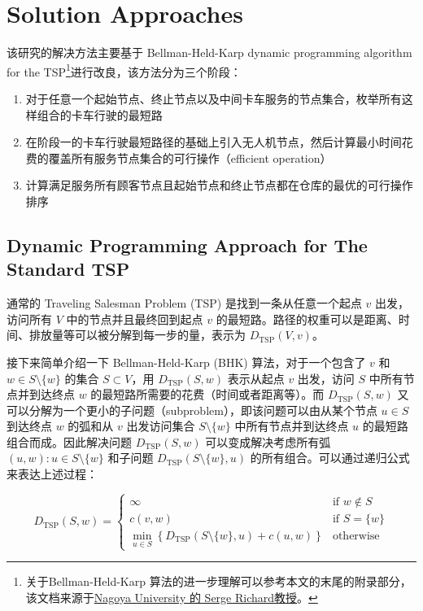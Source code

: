 \documentclass[fontset=none]{ctexart}
\begin{document}
\section{Solution Approaches}

该研究的解决方法主要基于 Bellman-Held-Karp dynamic programming algorithm for the TSP\footnote{关于Bellman-Held-Karp 算法的进一步理解可以参考本文的末尾的附录部分，该文档来源于\href{https://www.math.nagoya-u.ac.jp/~richard/teaching/s2020/Quang1.pdf}{Nagoya University 的 Serge Richard教授}。}进行改良\cite{bellmanDynamicProgrammingTreatment1962, heldDynamicProgrammingApproach1961}，该方法分为三个阶段：

\begin{enumerate}
    \item 对于任意一个起始节点、终止节点以及中间卡车服务的节点集合，枚举所有这样组合的卡车行驶的最短路
    \item 在阶段一的卡车行驶最短路径的基础上引入无人机节点，然后计算最小时间花费的覆盖所有服务节点集合的可行操作（efficient operation）
    \item 计算满足服务所有顾客节点且起始节点和终止节点都在仓库的最优的可行操作排序
\end{enumerate}

\subsection{Dynamic Programming Approach for The Standard TSP}

通常的 Traveling Salesman Problem (TSP) 是找到一条从任意一个起点 $v$ 出发，访问所有 $V$ 中的节点并且最终回到起点 $v$ 的最短路。路径的权重可以是距离、时间、排放量等可以被分解到每一步的量，表示为 $D_{\text{TSP}}(V,v)$。

接下来简单介绍一下 Bellman-Held-Karp (BHK) 算法，对于一个包含了 $v$ 和 $w \in S \setminus \{w\}$ 的集合 $S \subset V$，用 $D_{\text{TSP}}(S, w)$ 表示从起点 $v$ 出发，访问 $S$ 中所有节点并到达终点 $w$ 的最短路所需要的花费（时间或者距离等）。而 $D_{\text{TSP}}(S, w)$ 又可以分解为一个更小的子问题（subproblem），即该问题可以由从某个节点 $u \in S$ 到达终点 $w$ 的弧和从 $v$ 出发访问集合 $S \setminus \{w\}$ 中所有节点并到达终点 $u$ 的最短路组合而成。因此解决问题 $D_{\text{TSP}}(S, w)$ 可以变成解决考虑所有弧 $(u, w): u \in S \setminus \{w\}$ 和子问题 $D_{\text{TSP}}(S\setminus \{w\}, u)$ 的所有组合。可以通过递归公式来表达上述过程：

\begin{equation}
    D_{\text{TSP}}(S, w) =
    \begin{cases}
        \infty & \text{if } w \notin S \\
        c(v, w) & \text{if } S = \{w\} \\
        \min_{u \in S} \left\{D_{\text{TSP}}(S \setminus \{w\}, u) + c(u, w)\right\} & \text{otherwise}
    \end{cases}
\end{equation}
\end{document}

